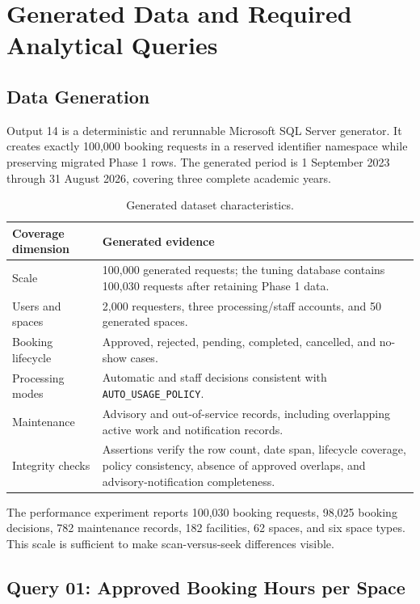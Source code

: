 \section{Generated Data and Required Analytical Queries}

\subsection{Data Generation}

Output 14 is a deterministic and rerunnable Microsoft SQL Server generator. It creates exactly 100,000 booking requests in a reserved identifier namespace while preserving migrated Phase 1 rows. The generated period is 1 September 2023 through 31 August 2026, covering three complete academic years.

\begin{table}[H]
  \centering
  \small
  \begin{tabularx}{\textwidth}{>{\raggedright\arraybackslash}p{4.2cm}X}
    \toprule
    \textbf{Coverage dimension} & \textbf{Generated evidence}\\
    \midrule
    Scale & 100,000 generated requests; the tuning database contains 100,030 requests after retaining Phase 1 data.\\
    Users and spaces & 2,000 requesters, three processing/staff accounts, and 50 generated spaces.\\
    Booking lifecycle & Approved, rejected, pending, completed, cancelled, and no-show cases.\\
    Processing modes & Automatic and staff decisions consistent with \texttt{AUTO\_USAGE\_POLICY}.\\
    Maintenance & Advisory and out-of-service records, including overlapping active work and notification records.\\
    Integrity checks & Assertions verify the row count, date span, lifecycle coverage, policy consistency, absence of approved overlaps, and advisory-notification completeness.\\
    \bottomrule
  \end{tabularx}
  \caption{Generated dataset characteristics.}
\end{table}

The performance experiment reports 100,030 booking requests, 98,025 booking decisions, 782 maintenance records, 182 facilities, 62 spaces, and six space types. This scale is sufficient to make scan-versus-seek differences visible.

\subsection{Query 01: Approved Booking Hours per Space}

